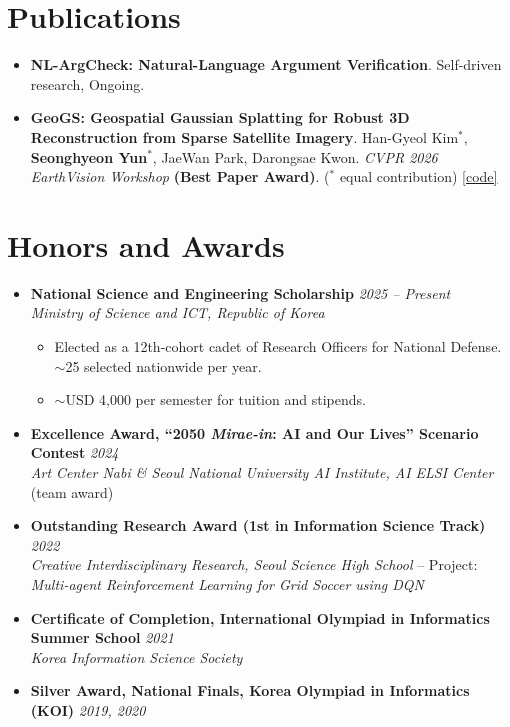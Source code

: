 \documentclass[10pt,a4paper]{article}
\begin{document}
\section*{Publications}
\begin{itemize}
  \item \textbf{NL-ArgCheck: Natural-Language Argument Verification}. Self-driven research, Ongoing.
  \item \textbf{GeoGS: Geospatial Gaussian Splatting for Robust 3D Reconstruction from Sparse Satellite \mbox{Imagery}}. Han-Gyeol Kim$^*$, \textbf{Seonghyeon Yun}$^*$, JaeWan Park, Darongsae Kwon. \emph{CVPR 2026 EarthVision Workshop} \textbf{(Best Paper Award)}. ($^*$ equal contribution) \href{https://github.com/tjdgus4384/GeoGS}{[code]}
\end{itemize}

\section*{Honors and Awards}
\begin{itemize}
  \item \textbf{National Science and Engineering Scholarship} \hfill \textit{2025 -- Present} \\
        \emph{Ministry of Science and ICT, Republic of Korea}
        \begin{itemize}
          \item Elected as a 12th-cohort cadet of Research Officers for National Defense. $\sim$25 selected nationwide per year.
          \item $\sim$USD 4,000 per semester for tuition and stipends.
        \end{itemize}
  \item \textbf{Excellence Award, ``2050 \emph{Mirae-in}: AI and Our Lives'' Scenario Contest} \hfill \textit{2024} \\
        \emph{Art Center Nabi \& Seoul National University AI Institute, AI ELSI Center} (team award)
  \item \textbf{Outstanding Research Award (1st in Information Science Track)} \hfill \textit{2022} \\
        \emph{Creative Interdisciplinary Research, Seoul Science High School} -- Project: \emph{Multi-agent Reinforcement Learning for Grid Soccer using DQN}
  \item \textbf{Certificate of Completion, International Olympiad in Informatics Summer School} \hfill \textit{2021} \\
        \emph{Korea Information Science Society}
  \item \textbf{Silver Award, National Finals, Korea Olympiad in Informatics (KOI)} \hfill \textit{2019, 2020}
\end{itemize}
\end{document}
